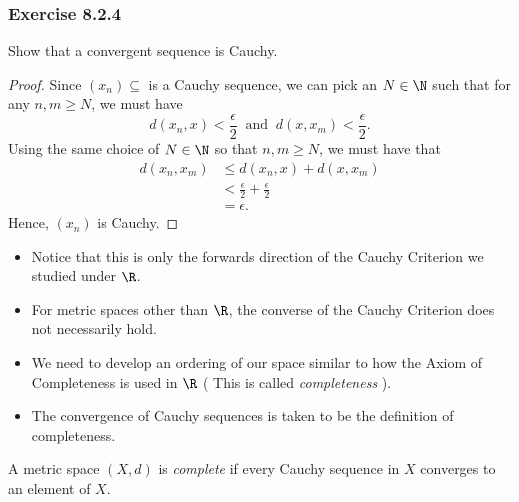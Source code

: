 \subsubsection{Exercise 8.2.4} Show that a convergent sequence is Cauchy.
\begin{proof}
    Since \( (x_{n}) \subseteq \) is a Cauchy sequence, we can pick an \( N \in \N  \) such that for any \( n,m \geq N  \), we must have 
    \[  d(x_{n}, x ) < \frac{ \epsilon  }{ 2  }  \ \text{ and } \ d(x, x_{m}) < \frac{ \epsilon  }{ 2 } .\] Using the same choice of \( N \in \N  \) so that \( n,m \geq N  \), we must have that
    \begin{align*}
        d(x_{n}, x_{m}) &\leq d(x_{n}, x )  + d(x, x_{m})\\ 
                        &< \frac{ \epsilon  }{ 2 }  + \frac{ \epsilon  }{ 2 }  \\
                        &= \epsilon.
    \end{align*}
    Hence, \( (x_{n}) \) is Cauchy.
\end{proof}

\begin{itemize}
    \item Notice that this is only the forwards direction of the Cauchy Criterion we studied under \( \R  \). 
    \item For metric spaces other than \( \R  \), the converse of the Cauchy Criterion does not necessarily hold.
    \item We need to develop an ordering of our space similar to how the Axiom of Completeness is used in \( \R  \) ( This is called \textit{completeness}  ). 
    \item The convergence of Cauchy sequences is taken to be the definition of completeness.
\end{itemize}


\begin{tcolorbox}
\begin{defn}
A metric space \( (X, d ) \) is \textit{complete} if every Cauchy sequence in \( X  \) converges to an element of \( X  \).
\end{defn}
\end{tcolorbox}


